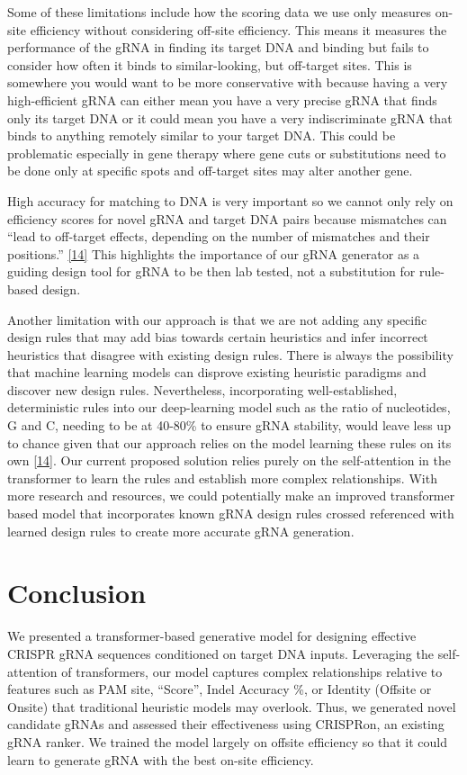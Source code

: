 \documentclass{article}
\begin{document}
Some of these limitations include how the scoring data we use only measures on-site efficiency without considering off-site efficiency. This means it measures the performance of the gRNA in finding its target DNA and binding but fails to consider how often it binds to similar-looking, but off-target sites. This is somewhere you would want to be more conservative with because having a very high-efficient gRNA can either mean you have a very precise gRNA that finds only its target DNA or it could mean you have a very indiscriminate gRNA that binds to anything remotely similar to your target DNA. This could be problematic especially in gene therapy where gene cuts or substitutions need to be done only at specific spots and off-target sites may alter another gene. 

High accuracy for matching to DNA is very important so we cannot only rely on efficiency scores for novel gRNA and target DNA pairs because mismatches can “lead to off-target effects, depending on the number of mismatches and their positions.'' \hyperref[Reference 14]{[14]} This highlights the importance of our gRNA generator as a guiding design tool for gRNA to be then lab tested, not a substitution for rule-based design.

Another limitation with our approach is that we are not adding any specific design rules that may add bias towards certain heuristics and infer incorrect heuristics that disagree with existing design rules. There is always the possibility that machine learning models can disprove existing heuristic paradigms and discover new design rules. Nevertheless, incorporating well-established, deterministic rules into our deep-learning model such as the ratio of nucleotides, G and C, needing to be at 40-80\% to ensure gRNA stability, would leave less up to chance given that our approach relies on the model learning these rules on its own \hyperref[Reference 14]{[14]}. Our current proposed solution relies purely on the self-attention in the transformer to learn the rules and establish more complex relationships. With more research and resources, we could potentially make an improved transformer based model that incorporates known gRNA design rules crossed referenced with learned design rules to create more accurate gRNA generation. 

\section{Conclusion}

We presented a transformer-based generative model for designing effective CRISPR gRNA sequences conditioned on target DNA inputs. Leveraging the self-attention of transformers, our model captures complex relationships relative to features such as PAM site, “Score”, Indel Accuracy \%, or Identity (Offsite or Onsite) that traditional heuristic models may overlook. Thus, we generated novel candidate gRNAs and assessed their effectiveness using CRISPRon, an existing gRNA ranker. We trained the model largely on offsite efficiency so that it could learn to generate gRNA with the best on-site efficiency. 
\end{document}
